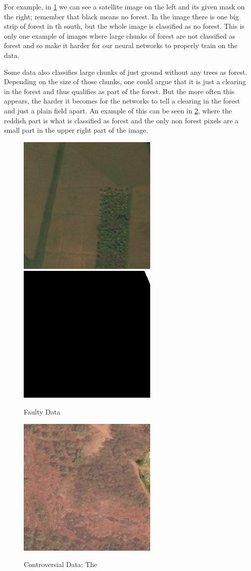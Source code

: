   For example, in \ref{badimg} we can see a satellite image on the left and its given mask on the right; remember that black means no forest. In the image there is one big strip of forest in th south, but the whole image is classified as no forest. This is only one example of images where large chunks of forest are not classified as forest and so make it harder for our neural networks to properly train on the data.

  Some data also classifies large chunks of just ground without any trees as forest. Depending on the size of those chunks, one could argue that it is just a clearing in the forest and thus qualifies as part of the forest. But the more often this appears, the harder it becomes for the networks to tell a clearing in the forest and just a plain field apart. An example of this can be seen in \ref{badimg2}, where the reddish part is what is classified as forest and the only non forest pixels are a small part in the upper right part of the image.

  \begin{figure}
    \begin{center}
    \label{badimg}
    \includegraphics[width=.4\linewidth]{images/satellite_images/1_imag}
    \includegraphics[width=.4\linewidth]{images/satellite_images/1_mask}
    \caption{Faulty Data}
    \end{center}
  \end{figure}

  \begin{figure}
    \begin{center}
    \label{badimg2}
    \includegraphics[width=.4\linewidth]{images/satellite_images/10_overlap}
    \caption{Controversial Data: The }
    \end{center}
  \end{figure}
